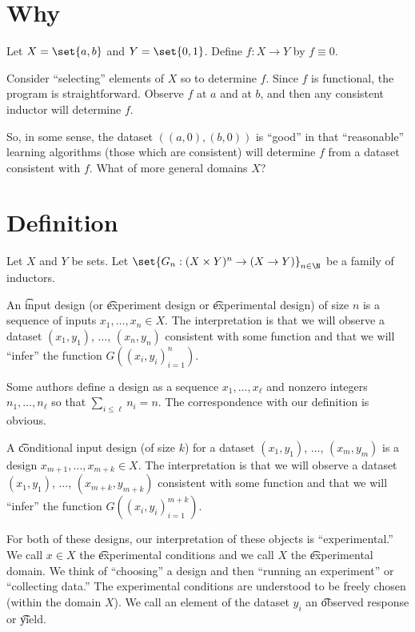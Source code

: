 
\section*{Why}

Let $X = \set{a, b}$ and $Y = \set{0, 1}$. Define $f: X \to Y$ by $f \equiv 0$.

Consider ``selecting'' elements of $X$ so to determine $f$.
Since $f$ is functional, the program is straightforward.
Observe $f$ at $a$ and at $b$, and then any consistent inductor will determine $f$.

So, in some sense, the dataset $((a,0), (b,0))$ is ``good'' in that ``reasonable'' learning algorithms (those which are consistent) will determine $f$ from a dataset consistent with $f$.
What of more general domains $X$?

\section*{Definition}

Let $X$ and $Y$ be sets.
Let $\set{G_n: (X \times Y)^n \to (X \to Y)}_{n \in \N}$ be a family of inductors.

An \t{input design} (or \t{experiment design} or \t{experimental design}) of size $n$ is a sequence of inputs $x_1, \dots , x_n \in X$.
The interpretation is that we will observe a dataset $(x_1, y_1)$, $\dots $, $(x_n, y_n)$ consistent with some function and that we will ``infer'' the function $G((x_i,y_i)_{i = 1}^{n})$.

Some authors define a design as a sequence $x_1, \dots , x_\ell $ and nonzero integers $n_1, \dots , n_{\ell }$ so that $\sum_{i \leq \ell } n_i = n$.
The correspondence with our definition is obvious.

A \t{conditional input design} (of size $k$) for a dataset $(x_1,y_1)$, $\dots $, $(x_m, y_m)$ is a design $x_{m+1}, \dots , x_{m+k} \in X$.
The interpretation is that we will observe a dataset $(x_1, y_1)$, $\dots $, $(x_{m+k}, y_{m+k})$ consistent with some function and that we will ``infer'' the function $G((x_i,y_i)_{i = 1}^{m+k})$.

For both of these designs, our interpretation of these objects is ``experimental.''
We call $x \in X$ the \t{experimental conditions} and we call $X$ the \t{experimental domain}.
We think of ``choosing'' a design and then ``running an experiment'' or ``collecting data.''
The experimental conditions are understood to be freely chosen (within the domain $X$).
We call an element of the dataset $y_i$ an \t{observed response} or \t{yield}.


